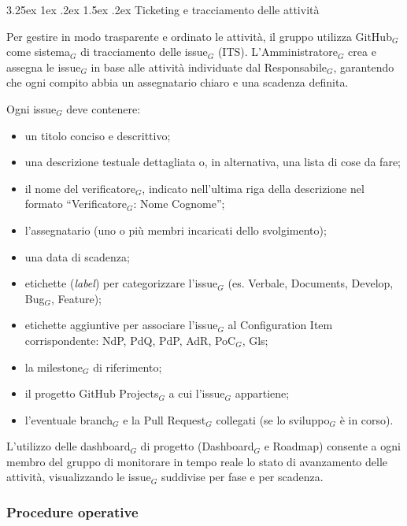 \documentclass[a4paper, 10pt]{article}
\makeatletter
\renewcommand\paragraph{\@startsection{paragraph}{4}{\z@}%
  {3.25ex \@plus1ex \@minus .2ex}%
  {1.5ex \@plus .2ex}%
  {\normalfont\normalsize\bfseries}}
\makeatother
\begin{document}
\paragraph{Ticketing e tracciamento delle attività}

Per gestire in modo trasparente e ordinato le attività, il gruppo utilizza GitHub$_G$ come sistema$_G$ di tracciamento delle issue$_G$ (ITS). L'Amministratore$_G$ crea e assegna le issue$_G$ in base alle attività individuate dal Responsabile$_G$, garantendo che ogni compito abbia un assegnatario chiaro e una scadenza definita.

Ogni issue$_G$ deve contenere:
\begin{itemize}
    \item un titolo conciso e descrittivo;
    \item una descrizione testuale dettagliata o, in alternativa, una lista di cose da fare;
    \item il nome del verificatore$_G$, indicato nell'ultima riga della descrizione nel formato ``Verificatore$_G$: Nome Cognome'';
    \item l'assegnatario (uno o più membri incaricati dello svolgimento);
    \item una data di scadenza;
    \item etichette (\emph{label}) per categorizzare l'issue$_G$ (es. Verbale, Documents, Develop, Bug$_G$, Feature);
    \item etichette aggiuntive per associare l'issue$_G$ al Configuration Item corrispondente: NdP, PdQ, PdP, AdR, PoC$_G$, Gls;
    \item la milestone$_G$ di riferimento;
    \item il progetto GitHub Projects$_G$ a cui l'issue$_G$ appartiene;
    \item l'eventuale branch$_G$ e la Pull Request$_G$ collegati (se lo sviluppo$_G$ è in corso).
\end{itemize}

L'utilizzo delle dashboard$_G$ di progetto (Dashboard$_G$ e Roadmap) consente a ogni membro del gruppo di monitorare in tempo reale lo stato di avanzamento delle attività, visualizzando le issue$_G$ suddivise per fase e per scadenza.

\subsubsection{Procedure operative}
\label{subsubsec:procedure_gestione}
\end{document}
